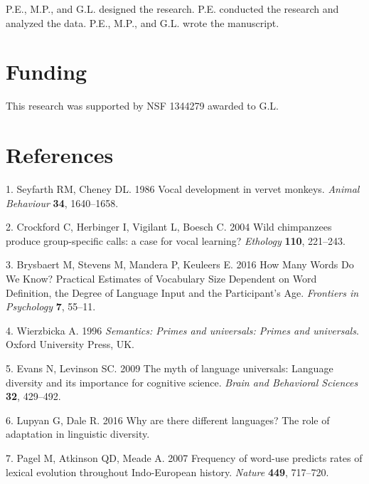 \documentclass[english,floatsintext,man]{apa6}
\theoremstyle{definition}
\theoremstyle{definition}
\theoremstyle{definition}
\theoremstyle{remark}
\begin{document}
P.E., M.P., and G.L. designed the research. P.E. conducted the research
and analyzed the data. P.E., M.P., and G.L. wrote the manuscript.

\hypertarget{funding}{%
\section{Funding}\label{funding}}

This research was supported by NSF 1344279 awarded to G.L.

\hypertarget{references}{%
\section{References}\label{references}}

\setlength{\parindent}{-0.5in}\setlength{\leftskip}{0.5in}

\hypertarget{refs}{}
\leavevmode\hypertarget{ref-Seyfarth:1986tw}{}%
1. Seyfarth RM, Cheney DL. 1986 Vocal development in vervet monkeys.
\emph{Animal Behaviour} \textbf{34}, 1640--1658.

\leavevmode\hypertarget{ref-Crockford:2004cz}{}%
2. Crockford C, Herbinger I, Vigilant L, Boesch C. 2004 Wild chimpanzees
produce group-specific calls: a case for vocal learning? \emph{Ethology}
\textbf{110}, 221--243.

\leavevmode\hypertarget{ref-Brysbaert:2016fg}{}%
3. Brysbaert M, Stevens M, Mandera P, Keuleers E. 2016 How Many Words Do
We Know? Practical Estimates of Vocabulary Size Dependent on Word
Definition, the Degree of Language Input and the Participant's Age.
\emph{Frontiers in Psychology} \textbf{7}, 55--11.

\leavevmode\hypertarget{ref-Wierzbicka:1996sm}{}%
4. Wierzbicka A. 1996 \emph{Semantics: Primes and universals: Primes and
universals}. Oxford University Press, UK.

\leavevmode\hypertarget{ref-Evans:2009dk}{}%
5. Evans N, Levinson SC. 2009 The myth of language universals: Language
diversity and its importance for cognitive science. \emph{Brain and
Behavioral Sciences} \textbf{32}, 429--492.

\leavevmode\hypertarget{ref-Lupyan:2016uw}{}%
6. Lupyan G, Dale R. 2016 Why are there different languages? The role of
adaptation in linguistic diversity.

\leavevmode\hypertarget{ref-Pagel:2007br}{}%
7. Pagel M, Atkinson QD, Meade A. 2007 Frequency of word-use predicts
rates of lexical evolution throughout Indo-European history.
\emph{Nature} \textbf{449}, 717--720.
\end{document}
